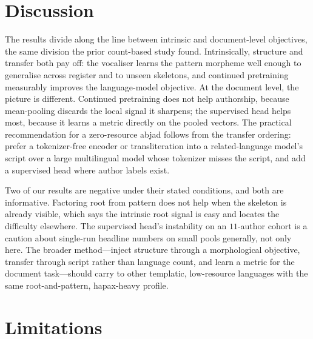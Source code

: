 \documentclass[11pt]{article}
\begin{document}
\section{Discussion}
\label{sec:discussion}

The results divide along the line between intrinsic and document-level objectives,
the same division the prior count-based study found. Intrinsically, structure and
transfer both pay off: the vocaliser learns the pattern morpheme well enough to
generalise across register and to unseen skeletons, and continued pretraining
measurably improves the language-model objective. At the document level, the
picture is different. Continued pretraining does not help authorship, because
mean-pooling discards the local signal it sharpens; the supervised head helps most,
because it learns a metric directly on the pooled vectors. The practical
recommendation for a zero-resource abjad follows from the transfer ordering: prefer
a tokenizer-free encoder or transliteration into a related-language model's script
over a large multilingual model whose tokenizer misses the script, and add a
supervised head where author labels exist.

Two of our results are negative under their stated conditions, and both are
informative. Factoring root from pattern does not help when the skeleton is already
visible, which says the intrinsic root signal is easy and locates the difficulty
elsewhere. The supervised head's instability on an $11$-author cohort is a caution
about single-run headline numbers on small pools generally, not only here. The
broader method---inject structure through a morphological objective, transfer
through script rather than language count, and learn a metric for the document
task---should carry to other templatic, low-resource languages with the same
root-and-pattern, hapax-heavy profile.

\section{Limitations}
\label{sec:limitations}
\end{document}
